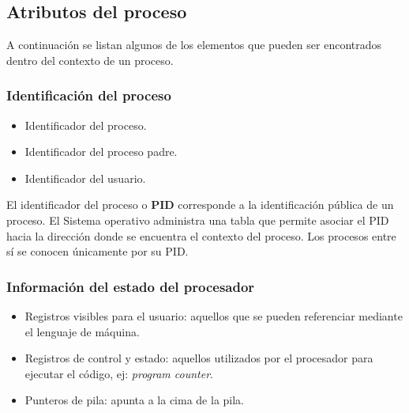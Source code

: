 \subsection{Atributos del proceso}
A continuación se listan algunos de los elementos que pueden ser encontrados
dentro del contexto de un proceso.

\subsubsection{Identificación del proceso}
\begin{itemize}

	\item Identificador del proceso.

	\item Identificador del proceso padre.

	\item Identificador del usuario.

\end{itemize}

El identificador del proceso o \textbf{PID} corresponde a la identificación
pública de un proceso. El Sistema operativo administra una tabla que permite
asociar el PID hacia la dirección donde se encuentra el contexto del proceso.
Los procesos entre sí se conocen únicamente por su PID.

\subsubsection{Información del estado del procesador}
\begin{itemize}

	\item Registros visibles para el usuario: aquellos que se pueden
	referenciar mediante el lenguaje de máquina.

	\item Registros de control y estado: aquellos utilizados por el
	procesador para ejecutar el código, ej: \textit{program counter}.

	\item Punteros de pila: apunta a la cima de la pila.

\end{itemize}

